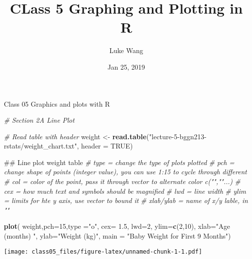 \documentclass[]{article}
\title{CLass 5 Graphing and Plotting in R}
\author{Luke Wang}
\date{Jan 25, 2019}
\newenvironment{Shaded}{\begin{snugshade}}{\end{snugshade}}
\newcommand{\KeywordTok}[1]{\textcolor[rgb]{0.13,0.29,0.53}{\textbf{#1}}}
\newcommand{\DataTypeTok}[1]{\textcolor[rgb]{0.13,0.29,0.53}{#1}}
\newcommand{\DecValTok}[1]{\textcolor[rgb]{0.00,0.00,0.81}{#1}}
\newcommand{\FloatTok}[1]{\textcolor[rgb]{0.00,0.00,0.81}{#1}}
\newcommand{\StringTok}[1]{\textcolor[rgb]{0.31,0.60,0.02}{#1}}
\newcommand{\CommentTok}[1]{\textcolor[rgb]{0.56,0.35,0.01}{\textit{#1}}}
\newcommand{\OtherTok}[1]{\textcolor[rgb]{0.56,0.35,0.01}{#1}}
\newcommand{\NormalTok}[1]{#1}
\begin{document}
\maketitle

Class 05 Graphics and plots with R

\begin{Shaded}
\begin{Highlighting}[]
\CommentTok{# Section 2A Line Plot}

\CommentTok{# Read table with header}
\NormalTok{weight <-}\StringTok{ }\KeywordTok{read.table}\NormalTok{(}\StringTok{"lecture-5-bggn213-rstats/weight_chart.txt"}\NormalTok{, }\DataTypeTok{header =} \OtherTok{TRUE}\NormalTok{)}

\NormalTok{## Line plot weight table}
\CommentTok{# type = change the type of plots plotted}
\CommentTok{# pch = change shape of points (integer value), you can use 1:15 to cycle through different }
\CommentTok{# col = color of the point, pass it through vector to alternate color  c("",""...)}
\CommentTok{# cex = how much text and symbols should be magnified}
\CommentTok{# lwd = line width}
\CommentTok{# ylim = limits for hte y axis, use vector to bound it}
\CommentTok{# xlab/ylab = name of x/y lable, in ""}

\KeywordTok{plot}\NormalTok{( weight,}\DataTypeTok{pch=}\DecValTok{15}\NormalTok{,}\DataTypeTok{type =}\StringTok{"o"}\NormalTok{, }\DataTypeTok{cex=} \FloatTok{1.5}\NormalTok{, }\DataTypeTok{lwd=}\DecValTok{2}\NormalTok{, }\DataTypeTok{ylim=}\KeywordTok{c}\NormalTok{(}\DecValTok{2}\NormalTok{,}\DecValTok{10}\NormalTok{), }\DataTypeTok{xlab=}\StringTok{"Age (months) "}\NormalTok{, }\DataTypeTok{ylab=}\StringTok{"Weight (kg)"}\NormalTok{, }\DataTypeTok{main =} \StringTok{"Baby Weight for First 9 Months"}\NormalTok{)}
\end{Highlighting}
\end{Shaded}

\texttt{[image: class05\_files/figure-latex/unnamed-chunk-1-1.pdf]}
\end{document}
